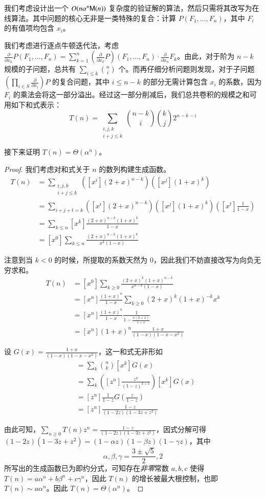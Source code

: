 我们考虑设计出一个 $O(n\alpha^n\mathsf M(n))$ 复杂度的验证解的算法，然后只需将其改写为在线算法。其中问题的核心无非是一类特殊的复合：计算 $P(F_1,\dots,F_n)$，其中 $F_i$ 的有值项均包含 $x_i$。

我们考虑进行逐点牛顿迭代法，考虑 $\frac{\partial}{\partial x_n} P(F_1,\dots,F_n) = \sum_{k=1}^n (\frac{\partial}{\partial x_k} P)(F_1,\dots,F_n) \cdot \frac{\partial}{\partial x_n} F_k$。由此，对于阶为 $n-k$ 规模的子问题，总共有 $\sum_{i\le k} \binom n i$ 个。而再仔细分析问题则发现，对于子问题 $(\prod_{i\in S} \frac{\partial}{\partial x_i})P$ 的复合问题，其中 $i\le n-k$ 的部分无需计算包含 $x_i$ 的系数，因为 $F_i$ 的乘法会将这一部分溢出。经过这一部分削减后，我们总共卷积的规模之和可用如下和式表示：
$$
T(n)=\sum_{\substack{i,j,k\\ i+j\le k}} \binom{n-k}i \binom{k}j 2^{n-k-i}
$$

接下来证明 $T(n) = \Theta(\alpha^n)$。
\begin{proof}
我们考虑对和式关于 $n$ 的数列构建生成函数。
\begin{align*}
T(n)&=\sum_{\substack{i,j,k\\ i+j\le k}} ([x^i](2+x)^{n-k})([x^j](1+x)^k)\\
&=\sum_{i+j+t=k} ([x^i](2+x)^{n-k})([x^j](1+x)^k)\left([x^t]\frac 1{1-x}\right)\\
&=\sum_{k\le n} [x^k] \frac{(2+x)^{n-k}(1+x)^k}{1-x}\\
&= [x^0]\sum_{k\le n} \frac{(2+x)^{n-k}(1+x)^k}{x^k(1-x)}
\end{align*}

注意到当 $k<0$ 的时候，所提取的系数天然为 $0$，因此我们不妨直接改写为向负无穷求和。
\begin{align*}
T(n) &= [x^0]\sum_{k\ge 0} \frac{(2+x)^{k}(1+x)^{n-k}}{x^{n-k} (1-x)}\\
&= [x^n]\frac{(1+x)^n}{1-x} \sum_{k\ge 0} (2+x)^k(1+x)^{-k}x^k\\
&= [x^n]\frac{(1+x)^n}{1-x} \frac 1{1-\frac{x(2+x)}{1+x}}\\
&= [x^n](1+x)^n \frac {1+x}{(1-x)(1-x-x^2)}
\end{align*}

设 $G(x)=\frac {1+x}{(1-x)(1-x-x^2)}$，这一和式无非形如
\begin{align*}
&= \sum_k \binom nk [x^k]G(x)\\
&= \sum_k \left([z^n] \frac{z^k}{(1-z)^{k+1}} \right) [x^k]G(x)\\
&= [z^n] \frac 1{1-z} G\left( \frac z{1-z} \right)\\
&= [z^n] \frac {1-z}{(1-2z)(1-3z+z^2)}
\end{align*}

由此可知，$\sum_{n\ge 0} T(n)z^n = \frac {1-z}{(1-2z)(1-3z+z^2)}$，因式分解可得 $(1-2z)(1-3z+z^2)=(1-\alpha z)(1-\beta z)(1-\gamma z)$，其中
$$
\alpha,\beta,\gamma = \frac{3\pm \sqrt 5}2, 2
$$
所写出的生成函数已为即约分式，可知存在\emph{非零}常数 $a,b,c$ 使得 $T(n) = a\alpha^n + b\beta^n + c\gamma^n$，因此 $T(n)$ 的增长被最大根控制，也即 $T(n) \sim a \alpha^n$。因此 $T(n) = \Theta(\alpha^n)$。
\end{proof}

